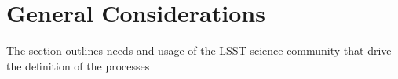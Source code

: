 \section{General Considerations} \label{sec:considerations}

The section outlines needs and usage of the LSST science community that drive the definition of the processes 
